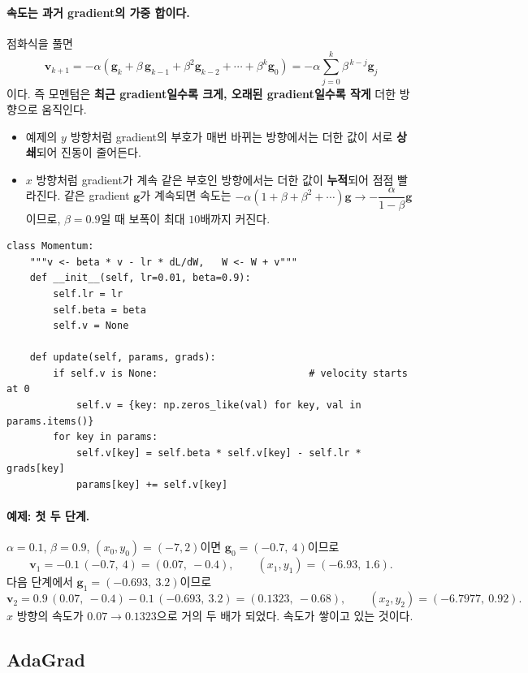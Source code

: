 \documentclass[11pt,a4paper]{article}
\begin{document}
\paragraph{속도는 과거 gradient의 가중 합이다.}
점화식을 풀면
\[
\bm v_{k+1}=-\alpha\left(\bm g_k+\beta\,\bm g_{k-1}+\beta^2\bm g_{k-2}+\cdots+\beta^k \bm g_0\right)
=-\alpha\sum_{j=0}^{k}\beta^{\,k-j}\bm g_j
\]
이다. 즉 모멘텀은 \textbf{최근 gradient일수록 크게, 오래된 gradient일수록 작게} 더한 방향으로 움직인다.
\begin{itemize}[leftmargin=1.8em]
\item 예제의 $y$ 방향처럼 gradient의 부호가 매번 바뀌는 방향에서는 더한 값이 서로 \textbf{상쇄}되어 진동이 줄어든다.
\item $x$ 방향처럼 gradient가 계속 같은 부호인 방향에서는 더한 값이 \textbf{누적}되어 점점 빨라진다.
같은 gradient $\bm g$가 계속되면 속도는 $-\alpha(1+\beta+\beta^2+\cdots)\bm g\to-\dfrac{\alpha}{1-\beta}\bm g$이므로,
$\beta=0.9$일 때 보폭이 최대 $10$배까지 커진다.
\end{itemize}

\begin{lstlisting}
class Momentum:
    """v <- beta * v - lr * dL/dW,   W <- W + v"""
    def __init__(self, lr=0.01, beta=0.9):
        self.lr = lr
        self.beta = beta
        self.v = None

    def update(self, params, grads):
        if self.v is None:                          # velocity starts at 0
            self.v = {key: np.zeros_like(val) for key, val in params.items()}
        for key in params:
            self.v[key] = self.beta * self.v[key] - self.lr * grads[key]
            params[key] += self.v[key]
\end{lstlisting}

\paragraph{예제: 첫 두 단계.}
$\alpha=0.1$, $\beta=0.9$, $(x_0,y_0)=(-7,2)$이면 $\bm g_0=(-0.7,\ 4)$이므로
\[
\bm v_1=-0.1\,(-0.7,\ 4)=(0.07,\ -0.4),
\qquad
(x_1,y_1)=(-6.93,\ 1.6).
\]
다음 단계에서 $\bm g_1=(-0.693,\ 3.2)$이므로
\[
\bm v_2=0.9\,(0.07,\ -0.4)-0.1\,(-0.693,\ 3.2)=(0.1323,\ -0.68),
\qquad
(x_2,y_2)=(-6.7977,\ 0.92).
\]
$x$ 방향의 속도가 $0.07\to0.1323$으로 거의 두 배가 되었다. 속도가 쌓이고 있는 것이다.

\subsection{AdaGrad}\label{sec:adagrad}
\end{document}
